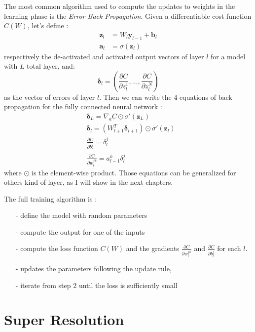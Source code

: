 \documentclass[12pt,a4paper]{report}
\begin{document}
The most common algorithm used to compute the updates to weights in the learning phase is the {\it Error Back Propagation}. 
Given a differentiable cost function $C(W)$, let's define :
\begin{align}
 \bm{z}_l &= W_l \bm{y}_{l-1} + \bm{b}_l  \\ 
 \bm{a}_l &= \sigma(\bm{z}_l)
\end{align}
respectively the de-activated and activated output vectors of layer $l$ for a model with $L$ total layer, and:
\begin{equation}
 \bm{\delta}_l = (\frac{\partial C}{\partial z_l^1}, \dots , \frac{\partial C}{\partial z_l^N}) 
\end{equation}
as the vector of errors of layer $l$. Then we can write the 4 equations of back propagation for the fully connected neural network \cite{neural-net-nielsen}:
\begin{align}
  &\bm{\delta}_L = \nabla_a C \odot \sigma'(\bm{z}_L) \\ 
  &\bm{\delta}_l = (W_{l+1}^T \bm{\delta}_{l+1}) \odot \sigma'(\bm{z}_l) \\
  &\frac{\partial C}{\partial b_l^j} = \delta_l^j \\
  &\frac{\partial C}{\partial w_l^{j k}} = a_{l-1}^k \delta_{l}^{j}
\end{align}
where  $\odot$ is the element-wise product.
Those equations can be generalized for others kind of layer, as I will show in the next chapters. 

The full training algorithm is : 

\begin{itemize}
 \setlength\itemsep{-0.3em}
 \item [-] define the model with random parameters
 \item [-] compute the output for one of the inputs
 \item [-] compute the loss function $C(W)$ and the gradients $\frac{\partial C}{\partial w_l^{j k}}$ and $\frac{\partial C}{\partial b_l^j}$ for each $l$.
 \item [-] updates the parameters following the update rule, 
 \item [-] iterate from step 2 until the loss is sufficiently small
\end{itemize}

\section{Super Resolution}
\end{document}
